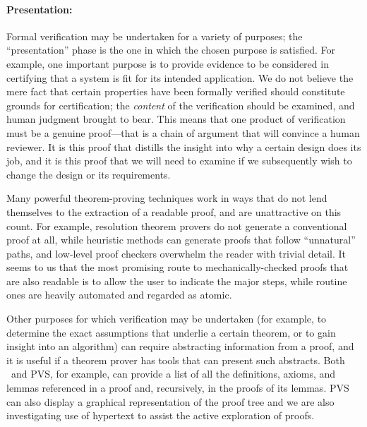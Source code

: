 \paragraph{Presentation:}
Formal verification may be undertaken
for a variety of purposes; the ``presentation'' phase is the one in
which the chosen purpose is satisfied.  For example, one important
purpose is to provide evidence to be considered in certifying that a
system is fit for its intended application.  We do not believe the
mere fact that certain properties have been formally verified should
constitute grounds for certification; the {\em content\/} of the
verification should be examined, and human judgment brought to bear.
This means that one product of verification must be a genuine
proof---that is a chain of argument that will convince a human
reviewer.  It is this proof that distills the insight into why a
certain design does its job, and it is this proof that we will need
to examine if we subsequently wish to change the design or its
requirements.  

Many powerful theorem-proving techniques work in ways that do not lend
themselves to the extraction of a readable proof, and are unattractive
on this count.  For example, resolution theorem provers do not
generate a conventional proof at all, while heuristic methods can
generate proofs that follow ``unnatural'' paths, and low-level
proof checkers overwhelm the reader with trivial detail.  It seems to
us that the most promising route to mechanically-checked proofs that
are also readable is to allow the user to indicate the major steps,
while routine ones are heavily automated and regarded as atomic.

Other purposes for which verification may be undertaken (for example,
to determine the exact assumptions that underlie a certain theorem, or
to gain insight into an algorithm) can require abstracting information
from a proof, and it is useful if a theorem prover has tools that can
present such abstracts.  Both \ehdm\ and PVS, for example, can provide
a list of all the definitions, axioms, and lemmas referenced in a
proof and, recursively, in the proofs of its lemmas.  PVS can also
display a graphical representation of the proof tree and we are also
investigating use of hypertext to assist the active exploration of
proofs.

